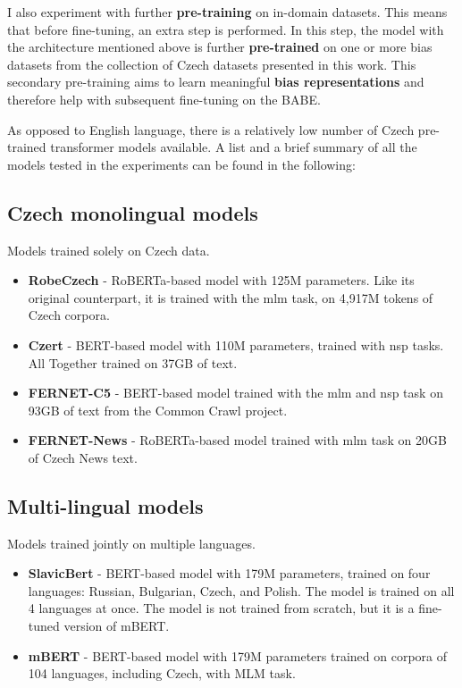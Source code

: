 I also experiment with further \textbf{pre-training} on in-domain datasets. This means that before fine-tuning, an extra step is performed. In this step, the model with the architecture mentioned above is further \textbf{pre-trained} on one or more bias datasets from the collection of Czech datasets presented in this work. This secondary pre-training aims to learn meaningful \textbf{bias representations} and therefore help with subsequent fine-tuning on the BABE.




As opposed to English language, there is a relatively low number of Czech pre-trained transformer models available. A list and a brief summary of all the models tested in the experiments can be found in the following:




\subsection{Czech monolingual models}
Models trained solely on Czech data.
\begin{itemize}
    \item \textbf{RobeCzech} \cite{strakarobeczech} - RoBERTa-based model with 125M parameters. Like its original counterpart, it is trained with the \gls{mlm} task, on 4,917M tokens of Czech corpora.
    \item \textbf{Czert} \cite{sido-etal-2021-czert} - BERT-based model with 110M parameters, trained with \gls{nsp} tasks. All Together trained on 37GB of text. 
    \item \textbf{FERNET-C5} \cite{lehevcka2021comparison} - BERT-based model trained with the \gls{mlm} and \gls{nsp} task on 93GB of text from the Common Crawl project.
    \item \textbf{FERNET-News} \cite{lehevcka2021comparison} - RoBERTa-based model trained with \gls{mlm} task on 20GB of Czech News text.
\end{itemize}




\subsection{Multi-lingual models}
Models trained jointly on multiple languages.
\begin{itemize}
    \item \textbf{SlavicBert} \cite{arkhipov2019tuning} - BERT-based model with 179M parameters, trained on four languages: Russian, Bulgarian, Czech, and Polish. The model is trained on all 4 languages at once. The model is not trained from scratch, but it is a fine-tuned version of mBERT.
    \item \textbf{mBERT} \cite{devlin2019bert} - BERT-based model with 179M parameters trained on corpora of 104 languages, including Czech, with MLM task.
\end{itemize}




